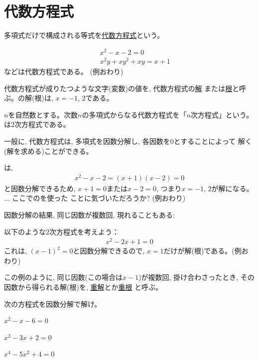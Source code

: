 \section{代数方程式}\label{sect:algeb_eq}

多項式だけで構成される等式を\underline{代数方程式}という。
\begin{exmpl}
\begin{eqnarray}
&&x^2-x-2=0 \label{eq:aleq1}\\
&&x^2y+xy^2+xy=x+1\label{eq:aleq12}
\end{eqnarray}
などは代数方程式である。
(例おわり)\end{exmpl}

代数方程式が成りたつような文字(変数)の値を, 代数方程式の\underline{解}
または\underline{根}と呼ぶ。の解(根)は, $x=-1,\, 2$である。

$n$を自然数とする。次数$n$の多項式からなる代数方程式を「$n$次方程式」という。
は2次方程式である。

一般に, 代数方程式は, 多項式を因数分解し, 各因数を0とすることによって
解く(解を求める)ことができる。
\begin{exmpl}
は, 
\begin{eqnarray}x^2-x-2=(x+1)(x-2)=0\end{eqnarray}
と因数分解できるため, $x+1=0$または$x-2=0$, つまり$x=-1,\, 2$が解になる。
... ここでのを使った
ことに気づいただろうか? 
(例おわり)\end{exmpl}\mv

因数分解の結果, 同じ因数が複数回, 現れることもある: 

\begin{exmpl} 以下のような2次方程式を考えよう：
\begin{eqnarray}
x^2-2x+1=0
\end{eqnarray}
これは, $(x-1)^2=0$と因数分解できるので, $x=1$だけが解(根)である。(例おわり)
\end{exmpl}

この例のように, 同じ因数(この場合は$x-1$)が複数回, 
掛け合わさったとき, その因数から得られる解(根)を, 
\underline{重解}とか\underline{重根}
と呼ぶ。
\mv

\begin{q}\label{q:alg_eq_insu0} 次の方程式を因数分解で解け。
\begin{edaenumerate}
\item $x^2-x-6=0$
\item $x^2-3x+2=0$
\item $x^4-5x^2+4=0$
\end{edaenumerate}
\end{q}
\mv

